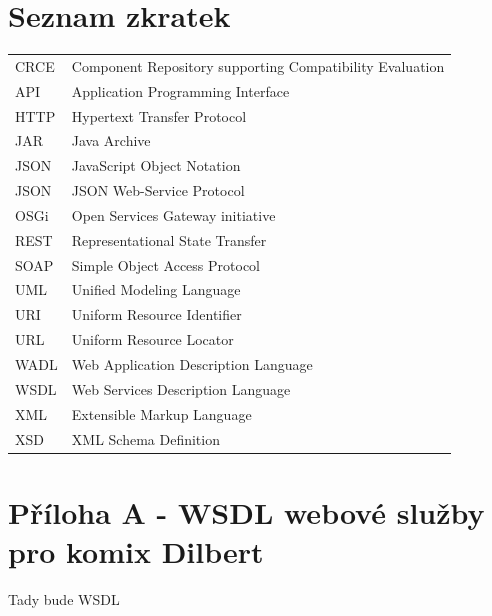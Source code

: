 \documentclass[czech,DP]{thesiskiv}
\newcommand\nomenclature[2]{#1 & #2 \\}
\begin{document}
\chapter*{Seznam zkratek}

\begin{longtable}{@{}p{3cm}@{}p{\dimexpr\textwidth-1cm\relax}@{}}
	\nomenclature{CRCE}{Component Repository supporting Compatibility Evaluation}
	\nomenclature{API}{Application Programming Interface}
	\nomenclature{HTTP}{Hypertext Transfer Protocol}
	\nomenclature{JAR}{Java Archive}
	\nomenclature{JSON}{JavaScript Object Notation}
	\nomenclature{JSON}{JSON Web-Service Protocol}
	\nomenclature{OSGi}{Open Services Gateway initiative}
	\nomenclature{REST}{Representational State Transfer}
	\nomenclature{SOAP}{Simple Object Access Protocol}
	\nomenclature{UML}{Unified Modeling Language}
	\nomenclature{URI}{Uniform Resource Identifier}
	\nomenclature{URL}{Uniform Resource Locator}
	\nomenclature{WADL}{Web Application Description Language}
	\nomenclature{WSDL}{Web Services Description Language}
	\nomenclature{XML}{Extensible Markup Language}
	\nomenclature{XSD}{XML Schema Definition}
\end{longtable}

\chapter*{Příloha A - WSDL webové služby pro komix Dilbert}
Tady bude WSDL
\end{document}
